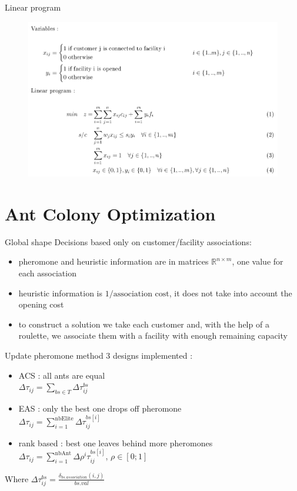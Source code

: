 \documentclass{beamer}
\begin{document}
\begin{frame}{Linear program}
    \begin{figure}
    \centering
    \includegraphics[scale=0.32]{model}
\end{figure}
\end{frame}

\section{Ant Colony Optimization}

\begin{frame}{Global shape}
Decisions based only on customer/facility associations:
\begin{itemize}
\item
pheromone and heuristic information are in matrices $\mathbb{R}^{n \times m}$, one value for each association
\item
heuristic information is $1/ \text{association cost}$, it does not take into account the opening cost
\item
to construct a solution we take each customer and, with the help of a roulette, we associate them with a facility with enough remaining capacity
\end{itemize}
\end{frame}

\begin{frame}{Update pheromone method}
3 designs implemented :
\begin{itemize}
\item
ACS : all ants are equal \\
$\Delta \tau_{ij} = \sum \limits_{bs \in T} \Delta \tau_{ij}^{bs}$
\item
EAS : only the best one drops off pheromone \\
$\Delta \tau_{ij} = \sum \limits_{i = 1}^{\text{nbElite}} \Delta \tau_{ij}^{bs\left[i\right]}$
\item
rank based : best one leaves behind more pheromones \\
$\Delta \tau_{ij} = \sum \limits_{i = 1}^{\text{nbAnt}} \Delta \rho^i \tau_{ij}^{bs\left[ i \right] }$, $\rho \in \left[ 0 ; 1 \right] $
\end{itemize}
Where $\Delta \tau_{ij}^{bs} = \frac{\delta_{bs.association}(i,j)}{bs.val}$
\end{frame}
\end{document}
